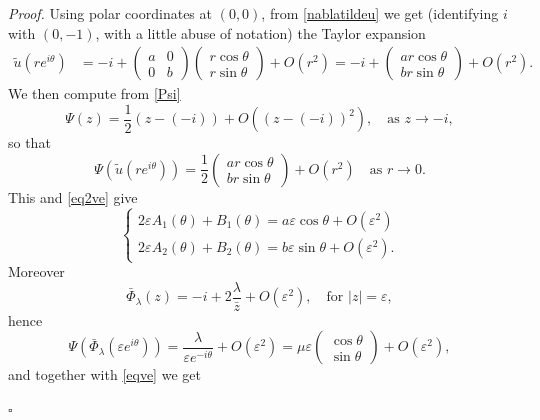 \documentclass[12pt, a4paper]{article}
\newenvironment{proof}{\noindent\emph{Proof.}}{\hfill$\square$\medskip}
\newcommand{\ve}{\varepsilon}
\newcommand{\blu}[1]{{\color{blue}#1}}
\renewcommand{\(}{\left(}
\renewcommand{\)}{\right)}
\begin{document}
\begin{proof}
Using polar coordinates at $(0,0)$, from \eqref{nablatildeu} we get (identifying $i$ with $(0,-1)$, with a little abuse of notation) the Taylor expansion %
\begin{align*}
\tilde u(re^{i\theta})&=-i+\begin{pmatrix}a&0\\0&b\end{pmatrix}\begin{pmatrix}r\cos\theta\\ r\sin\theta\end{pmatrix}+O(r^2)=-i+\begin{pmatrix}ar\cos\theta\\br\sin\theta\end{pmatrix}+O(r^2).
\end{align*}
We then compute from \eqref{Psi}
$$\Psi(z)=\frac{1}{2}(z-(-i))+O((z-(-i))^2),\quad \text{as }z\to -i, $$
so that
$$\Psi(\tilde u(re^{i\theta}))=\frac{1}{2}\begin{pmatrix}ar\cos\theta\\br\sin\theta\end{pmatrix}+O(r^2)\quad \text{as }r\to 0.$$
This and \eqref{eq2ve} give
\begin{equation}\label{sys1}
\begin{cases}
2\ve A_1(\theta)+B_1(\theta)=a\ve\cos\theta+O(\ve^2)\\
2\ve A_2(\theta)+B_2(\theta)=b\ve\sin\theta+O(\ve^2).
\end{cases}
\end{equation}
Moreover
\begin{equation}\label{barPhi0}
\bar \Phi_\lambda(z)=-i+2\frac{\lambda}{\bar z}+O(\ve^2),\quad \text{for }|z|=\ve,
\end{equation}
hence %
$$\Psi(\bar  \Phi_\lambda(\ve e^{i\theta}))= \frac{\lambda}{\ve e^{-i\theta}}+O(\ve^2) =\mu\ve\begin{pmatrix}\cos\theta\\\sin\theta\end{pmatrix}+O(\ve^2),$$
and together with \eqref{eqve} we get

\end{proof}
\end{document}
